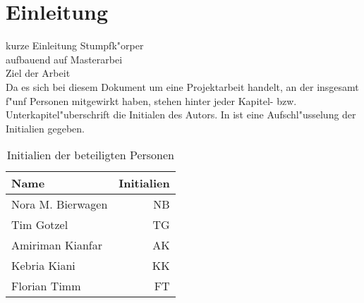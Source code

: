 \chapter{Einleitung}\label{s:einleitung}

kurze Einleitung Stumpfk"orper\\
aufbauend auf Masterarbei\\
Ziel der Arbeit\\

Da es sich bei diesem Dokument um eine Projektarbeit handelt, an der insgesamt f"unf Personen mitgewirkt haben, stehen hinter jeder Kapitel- bzw. Unterkapitel"uberschrift die Initialen des Autors. In  ist eine Aufschl"usselung der Initialien gegeben.

\begin{table}[h]
	\centering
	\begin{tabular}{lr}
		\toprule
		Name & Initialien\\
		\midrule
		Nora M. Bierwagen & NB\\
		Tim Gotzel & TG\\
		Amiriman Kianfar & AK\\
		Kebria Kiani & KK\\
		Florian Timm & FT\\
		\bottomrule
	\end{tabular}
	\caption{Initialien der beteiligten Personen}
	\label{tab:initialien}
\end{table}
